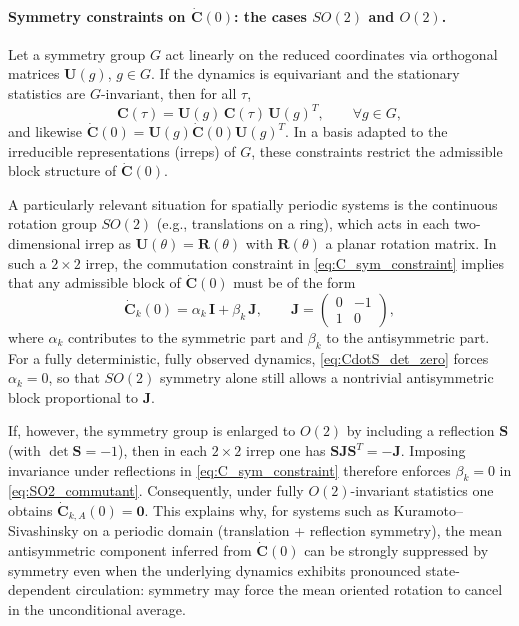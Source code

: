 \documentclass[%
  prl,
  reprint,
  amsmath,
  amssymb,
  aps
]{revtex4-2}
\begin{document}
\paragraph{Symmetry constraints on $\dot{\bm{C}}(0)$: the cases $SO(2)$ and $O(2)$.}
Let a symmetry group $G$ act linearly on the reduced coordinates via orthogonal matrices $\bm{U}(g)$, $g\in G$. If the dynamics is equivariant and the stationary statistics are $G$-invariant, then for all $\tau$,
\begin{equation}
\bm{C}(\tau)=\bm{U}(g)\,\bm{C}(\tau)\,\bm{U}(g)^T,
\qquad \forall g\in G,
\label{eq:C_sym_constraint}
\end{equation}
and likewise $\dot{\bm{C}}(0)=\bm{U}(g)\dot{\bm{C}}(0)\bm{U}(g)^T$. In a basis adapted to the irreducible representations (irreps) of $G$, these constraints restrict the admissible block structure of $\dot{\bm{C}}(0)$.

A particularly relevant situation for spatially periodic systems is the continuous rotation group $SO(2)$ (e.g., translations on a ring), which acts in each two-dimensional irrep as $\bm{U}(\theta)=\bm{R}(\theta)$ with $\bm{R}(\theta)$ a planar rotation matrix. In such a $2\times2$ irrep, the commutation constraint in \eqref{eq:C_sym_constraint} implies that any admissible block of $\dot{\bm{C}}(0)$ must be of the form
\begin{equation}
\dot{\bm{C}}_k(0)=\alpha_k\,\bm{I}+\beta_k\,\bm{J},
\qquad
\bm{J}=\begin{pmatrix}0&-1\\1&0\end{pmatrix},
\label{eq:SO2_commutant}
\end{equation}
where $\alpha_k$ contributes to the symmetric part and $\beta_k$ to the antisymmetric part. For a fully deterministic, fully observed dynamics, \eqref{eq:CdotS_det_zero} forces $\alpha_k=0$, so that $SO(2)$ symmetry alone still allows a nontrivial antisymmetric block proportional to $\bm{J}$.

If, however, the symmetry group is enlarged to $O(2)$ by including a reflection $\bm{S}$ (with $\det\bm{S}=-1$), then in each $2\times2$ irrep one has $\bm{S}\bm{J}\bm{S}^T=-\bm{J}$. Imposing invariance under reflections in \eqref{eq:C_sym_constraint} therefore enforces $\beta_k=0$ in \eqref{eq:SO2_commutant}. Consequently, under fully $O(2)$-invariant statistics one obtains $\dot{\bm{C}}_{k,A}(0)=\bm{0}$. This explains why, for systems such as Kuramoto--Sivashinsky on a periodic domain (translation + reflection symmetry), the mean antisymmetric component inferred from $\dot{\bm{C}}(0)$ can be strongly suppressed by symmetry even when the underlying dynamics exhibits pronounced state-dependent circulation: symmetry may force the mean oriented rotation to cancel in the unconditional average.
\end{document}
